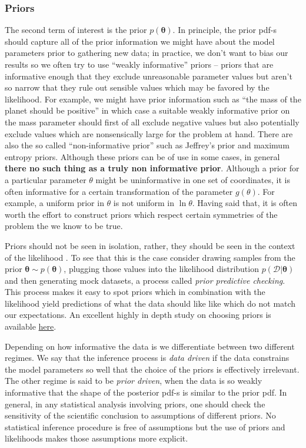 \documentclass[12pt]{report}
\renewcommand{\vec}[1]{\boldsymbol{\mathbf{#1}}}
\begin{document}
\subsubsection{Priors}
The second term of interest is the prior $p(\vec{\theta})$. In principle, the
prior pdf-s should capture all of the prior information we might have about the
model parameters prior to gathering new data; in practice, we don't want to
bias our results so we often try to use ``weakly informative'' priors -- priors
that are informative enough that they exclude unreasonable parameter values but
aren't so narrow that they rule out sensible values which may be favored by the
likelihood. For example, we might have prior information such as ``the mass of
the planet should be positive'' in which case a suitable weakly informative
prior on the mass parameter should first of all exclude negative values but
also potentially exclude values which are nonsensically large for the problem
at hand. There are also the so called ``non-informative prior'' such as
Jeffrey's prior and maximum entropy priors. Although these priors can be of use
in some cases, in general \textbf{there no such thing as a truly non
    informative prior}. Although a prior for a particular parameter $\theta$ might
be uninformative in one set of coordinates, it is often informative for a
certain transformation of the parameter $g(\theta)$. For example, a uniform
prior in $\theta$ is not uniform in $\ln\theta$. Having said that, it is often
worth the effort to construct priors which respect certain symmetries of the
problem the we know to be true.

Priors should not be seen in isolation, rather, they should be seen in the
context of the likelihood \citep{arXiv:1708.07487}. To see that this is the
case consider drawing samples from the prior $\vec{\theta}\sim
    p(\vec{\theta})$, plugging those values into the likelihood distribution
$p(\mathcal{D}|\vec{\theta})$ and then generating mock datasets, a process
called \emph{prior predictive checking}. This process makes it easy to spot
priors which in combination with the likelihood yield predictions of what the
data should like like which do not match our expectations. An excellent highly
in depth study on choosing priors is available
\href{https://betanalpha.github.io/assets/case_studies/prior_modeling.html}{here}.

Depending on how informative the data is we differentiate between two different
regimes. We say that the inference process is \emph{data driven} if the data
constrains the model parameters so well that the choice of the priors is
effectively irrelevant. The other regime is said to be \emph{prior driven},
when the data is so weakly informative that the shape of the posterior pdf-s is
similar to the prior pdf. In general, in any statistical analysis involving
priors, one should check the sensitivity of the scientific conclusion to
assumptions of different priors. No statistical inference procedure is free of
assumptions but the use of priors and likelihoods makes those assumptions more
explicit.
\end{document}
